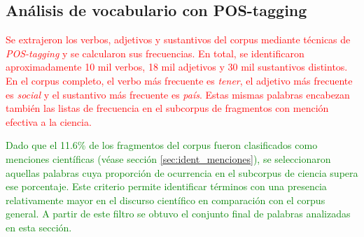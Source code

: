 \documentclass[11pt,a4paper]{article}
\begin{document}
	\subsection{Análisis de vocabulario con POS-tagging}
%
%

\textcolor{red}{Se extrajeron los verbos, adjetivos y sustantivos del corpus mediante técnicas de \emph{POS-tagging} y se calcularon sus frecuencias. En total, se identificaron aproximadamente 10 mil verbos, 18 mil adjetivos y 30 mil sustantivos distintos. En el corpus completo, el verbo más frecuente es \textit{tener}, el adjetivo más frecuente es \textit{social} y el sustantivo más frecuente es \textit{país}. Estas mismas palabras encabezan también las listas de frecuencia en el subcorpus de fragmentos con mención efectiva a la ciencia.}

\textcolor{green}{Dado que el 11.6\% de los fragmentos del corpus fueron clasificados como menciones científicas (véase sección \ref{sec:ident_menciones}), se seleccionaron aquellas palabras cuya proporción de ocurrencia en el subcorpus de ciencia supera ese porcentaje. Este criterio permite identificar términos con una presencia relativamente mayor en el discurso científico en comparación con el corpus general. A partir de este filtro se obtuvo el conjunto final de palabras analizadas en esta sección.}
\end{document}
